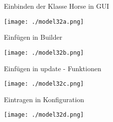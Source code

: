\begin{frame}{Einbinden der Klasse Horse in GUI}
	\begin{center}
		\texttt{[image: ./model32a.png]}
	\end{center}
\end{frame}


\begin{frame}{Einfügen in Builder}
	\begin{center}
		\texttt{[image: ./model32b.png]}
	\end{center}
\end{frame}

\begin{frame}{Einfügen in update - Funktionen}
	\begin{center}
		\texttt{[image: ./model32c.png]}
	\end{center}
\end{frame}

\begin{frame}{Eintragen in Konfiguration}
	\begin{center}
		\texttt{[image: ./model32d.png]}
	\end{center}
\end{frame}


